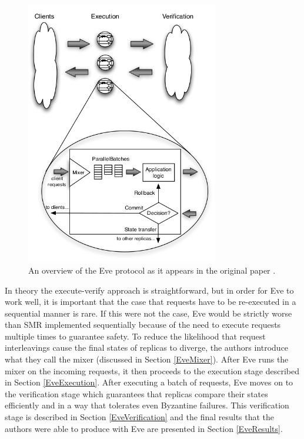 \documentclass[11pt, oneside]{report}
\begin{document}
\begin{figure}[h]
\centering
\includegraphics[width=0.75\textwidth]{eveOverview.png}
\caption{\label{eveDiagram} An overview of the Eve protocol as it appears in the original paper \protect\cite{eve}.}
\end{figure}

In theory the execute-verify approach is straightforward, but in order for Eve to work well, it is important that the case that requests have to be re-executed in a sequential manner is rare. 
If this were not the case, Eve would be strictly worse than SMR implemented sequentially because of the need to execute requests multiple times to guarantee safety. 
To reduce the likelihood that request interleavings cause the final states of replicas to diverge, the authors introduce what they call the mixer (discussed in Section \ref{EveMixer}). 
After Eve runs the mixer on the incoming requests, it then proceeds to the execution stage described in Section \ref{EveExecution}. 
After executing a batch of requests, Eve moves on to the verification stage which guarantees that replicas compare their states efficiently and in a way that tolerates even Byzantine failures. 
This verification stage is described in Section \ref{EveVerification} and the final results that the authors were able to produce with Eve are presented in Section \ref{EveResults}.
\end{document}
